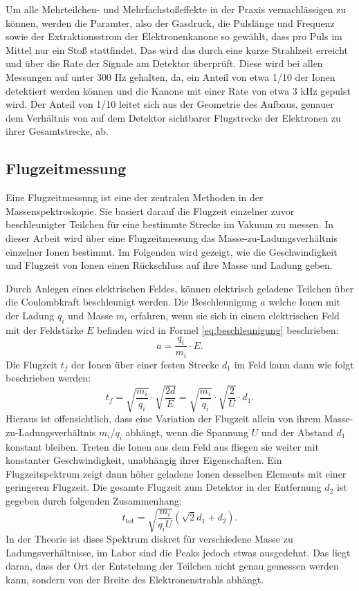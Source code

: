 Um alle Mehrteilchen- und Mehrfachstoßeffekte in der Praxis vernachlässigen zu können, werden die Paramter, also der Gasdruck, die Pulslänge und Frequenz sowie der Extraktionsstrom der Elektronenkanone so gewählt, dass pro Puls im Mittel nur ein Stoß stattfindet. Das wird das durch eine kurze Strahlzeit erreicht und über die Rate der Signale am Detektor überprüft. Diese wird bei allen Messungen auf unter 300 Hz gehalten, da, ein Anteil von etwa 1/10 der Ionen detektiert werden können und die Kanone mit einer Rate von etwa 3 kHz gepulst wird. Der Anteil von 1/10 leitet sich aus der Geometrie des Aufbaus, genauer dem Verhältnis von auf dem Detektor sichtbarer Flugstrecke der Elektronen zu ihrer Gesamtstrecke, ab.

\subsection{Flugzeitmessung}
Eine Flugzeitmessung ist eine der zentralen Methoden in der Massenspektroskopie. Sie basiert darauf die Flugzeit einzelner zuvor beschleunigter Teilchen für eine bestimmte Strecke im Vakuum zu messen. In dieser Arbeit wird über eine Flugzeitmessung das Masse-zu-Ladungsverhältnis einzelner Ionen bestimmt. Im Folgenden wird gezeigt, wie die Geschwindigkeit und Flugzeit von Ionen einen Rückschluss auf ihre Masse und Ladung geben.

Durch Anlegen eines elektrischen Feldes, können elektrisch geladene Teilchen über die Coulombkraft beschleunigt werden. Die Beschleunigung $a$ welche Ionen mit der Ladung $q_i$ und Masse $m_i$ erfahren, wenn sie sich in einem elektrischen Feld mit der Feldstärke $E$ befinden wird in Formel \ref{eq:beschleunigung} beschrieben: 
\begin{equation}
    \label{eq:beschleunigung}
    a = \frac{q_i}{m_i} \cdot E.
\end{equation}
Die Flugzeit $t_f$ der Ionen über einer festen Strecke $d_1$ im Feld kann dann wie folgt beschrieben werden:
\begin{equation}
    t_f = \sqrt{\frac{m_i}{q_i}} \cdot \sqrt{\frac{2d}{E}} = \sqrt{\frac{m_i}{q_i}} \cdot \sqrt{\frac{2}{U}} \cdot d_1.
\end{equation}
Hieraus ist offensichtlich, dass eine Variation der Flugzeit allein von ihrem Masse-zu-Ladungsverhältnis ${m_i}$/${q_i}$ abhängt, wenn die Spannung $U$ und der Abstand $d_1$ konstant bleiben. Treten die Ionen aus dem Feld aus fliegen sie weiter mit konstanter Geschwindigkeit, unabhängig ihrer Eigenschaften. Ein Flugzeitspektrum zeigt dann höher geladene Ionen desselben Elements mit einer geringeren Flugzeit. Die gesamte Flugzeit zum Detektor in der Entfernung $d_2$ ist gegeben durch folgenden Zusammenhang:
\begin{equation}
    t_{\text{tot}} = \sqrt{\frac{m_i}{q_i U}} \left( \sqrt{2} d_1 + d_2 \right).
    \label{eq:time}
\end{equation}
In der Theorie ist dises Spektrum diskret für verschiedene Masse zu Ladungsverhältnisse, im Labor sind die Peaks jedoch etwas ausgedehnt. Das liegt daran, dass der Ort der Entstehung der Teilchen nicht genau gemessen werden kann, sondern von der Breite des Elektronenstrahls abhängt.

